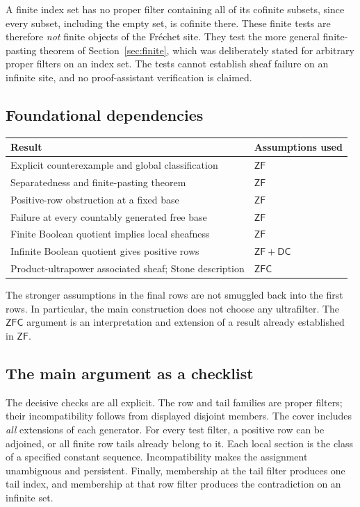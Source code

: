 \documentclass[11pt,letterpaper]{article}
\theoremstyle{definition}
\theoremstyle{remark}
\newcommand{\ZF}{\mathsf{ZF}}
\newcommand{\DC}{\mathsf{DC}}
\newcommand{\ZFC}{\mathsf{ZFC}}
\begin{document}
A finite index set has no proper filter containing all of its cofinite
subsets, since every subset, including the empty set, is cofinite there.
These finite tests are therefore \emph{not} finite objects of the
Fr\'echet site. They test the more general finite-pasting theorem of
Section~\ref{sec:finite}, which was deliberately stated for arbitrary
proper filters on an index set. The tests cannot establish sheaf failure
on an infinite site, and no proof-assistant verification is claimed.

\subsection{Foundational dependencies}
\begin{center}
\small
\begin{tabular}{p{}p{}}
\toprule
Result & Assumptions used\\
\midrule
Explicit counterexample and global classification & $\ZF$\\
Separatedness and finite-pasting theorem & $\ZF$\\
Positive-row obstruction at a fixed base & $\ZF$\\
Failure at every countably generated free base & $\ZF$\\
Finite Boolean quotient implies local sheafness & $\ZF$\\
Infinite Boolean quotient gives positive rows & $\ZF+\DC$\\
Product-ultrapower associated sheaf; Stone description & $\ZFC$\\
\bottomrule
\end{tabular}
\end{center}
The stronger assumptions in the final rows are not smuggled back into
the first rows. In particular, the main construction does not choose any
ultrafilter. The $\ZFC$ argument is an interpretation and extension of a
result already established in $\ZF$.

\subsection{The main argument as a checklist}
The decisive checks are all explicit. The row and tail families are
proper filters; their incompatibility follows from displayed disjoint
members. The cover includes \emph{all} extensions of each generator.
For every test filter, a positive row can be adjoined, or all finite row
tails already belong to it. Each local section is the class of a
specified constant sequence. Incompatibility makes the assignment
unambiguous and persistent. Finally, membership at the tail filter
produces one tail index, and membership at that row filter produces
the contradiction on an infinite set.
\end{document}
